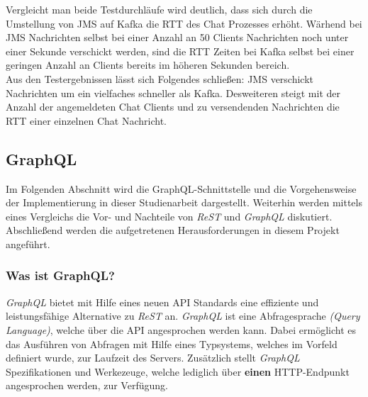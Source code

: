 \documentclass[10pt,journal,compsoc]{IEEEtran}
\begin{document}
Vergleicht man beide Testdurchläufe wird deutlich, dass sich durch die Umstellung von JMS auf Kafka die RTT des Chat Prozesses erhöht. Wärhend bei JMS Nachrichten selbst bei einer Anzahl an 50 Clients Nachrichten noch unter einer Sekunde verschickt werden, sind die RTT Zeiten bei Kafka selbst bei einer geringen Anzahl an Clients bereits im höheren Sekunden bereich.
\\
Aus den Testergebnissen lässt sich Folgendes schließen: JMS verschickt Nachrichten um ein vielfaches schneller als Kafka. Desweiteren steigt mit der Anzahl der angemeldeten Chat Clients und zu versendenden Nachrichten die RTT einer einzelnen Chat Nachricht.



\subsection{GraphQL}
Im Folgenden Abschnitt wird die GraphQL-Schnittstelle  und die Vorgehensweise der Implementierung in dieser Studienarbeit dargestellt. Weiterhin werden mittels eines Vergleichs die Vor- und Nachteile von \textit{ReST} und \textit{GraphQL} diskutiert. Abschließend werden die aufgetretenen Herausforderungen in diesem Projekt angeführt.


\subsubsection{Was ist GraphQL?}
\textit{GraphQL} bietet mit Hilfe eines neuen API Standards eine effiziente und leistungsfähige Alternative zu \textit{ReST} an. \textit{GraphQL} ist eine Abfragesprache \textit{(Query Language)}, welche über die API angesprochen werden kann. Dabei ermöglicht es das Ausführen von Abfragen mit Hilfe eines Typsystems, welches im Vorfeld definiert wurde, zur Laufzeit des Servers. Zusätzlich stellt \textit{GraphQL} Spezifikationen und Werkezeuge, welche lediglich über \textbf{einen} HTTP-Endpunkt angesprochen werden, zur Verfügung. \cite{GraphQL:Introduction}
\end{document}
